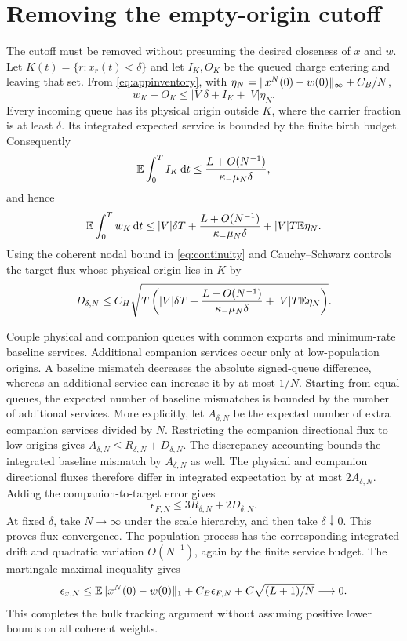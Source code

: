 \section{Removing the empty-origin cutoff}\label{section:kinetic:removing-the-empty-origin-cutoff}
The cutoff must be removed without presuming the desired closeness of $x$ and $w$. Let $K(t)=\{r:x_r(t)<\delta\}$ and let $I_K,O_K$ be the queued charge entering and leaving that set. From \cref{eq:appinventory}, with $\eta_N=\lVert x^N(0)-w(0)\rVert_\infty+C_B/N$,
\[
w_K+O_K\le |V|\delta+I_K+|V|\eta_N.
\]
Every incoming queue has its physical origin outside $K$, where the carrier fraction is at least $\delta$. Its integrated expected service is bounded by the finite birth budget. Consequently
\[
\mathbb E\int_0^T I_K\,\mathrm d t\le\frac{L+O(N^{-1})}{\kappa_-\mu_N\delta},
\]
and hence
\[
\mathbb E\int_0^T w_K\,\mathrm d t
\le |V|\delta T+\frac{L+O(N^{-1})}{\kappa_-\mu_N\delta}
 +|V|T\mathbb E\eta_N.
\]
Using the coherent nodal bound in \cref{eq:continuity} and Cauchy--Schwarz controls the target flux whose physical origin lies in $K$ by
\begin{equation}\label{eq:appsmall}
D_{\delta,N}\le C_H\sqrt{T\left(|V|\delta T+
\frac{L+O(N^{-1})}{\kappa_-\mu_N\delta}+|V|T\mathbb E\eta_N\right)}.
\end{equation}

Couple physical and companion queues with common exports and minimum-rate baseline services. Additional companion services occur only at low-population origins. A baseline mismatch decreases the absolute signed-queue difference, whereas an additional service can increase it by at most $1/N$. Starting from equal queues, the expected number of baseline mismatches is bounded by the number of additional services. More explicitly, let $A_{\delta,N}$ be the expected number of extra companion services divided by $N$. Restricting the companion directional flux to low origins gives $A_{\delta,N}\le R_{\delta,N}+D_{\delta,N}$. The discrepancy accounting bounds the integrated baseline mismatch by $A_{\delta,N}$ as well. The physical and companion directional fluxes therefore differ in integrated expectation by at most $2A_{\delta,N}$. Adding the companion-to-target error gives
\[
\epsilon_{F,N}\le3R_{\delta,N}+2D_{\delta,N}.
\]
At fixed $\delta$, take $N\to\infty$ under the scale hierarchy, and then take $\delta\downarrow0$. This proves flux convergence. The population process has the corresponding integrated drift and quadratic variation $O(N^{-1})$, again by the finite service budget. The martingale maximal inequality gives
\[
\epsilon_{x,N}\le\mathbb E\lVert x^N(0)-w(0)\rVert_1
+C_B\epsilon_{F,N}+C\sqrt{(L+1)/N}\longrightarrow0.
\]
This completes the bulk tracking argument without assuming positive lower bounds on all coherent weights.

